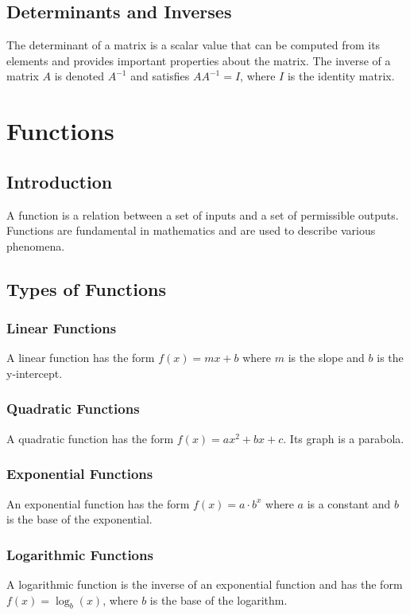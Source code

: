 \documentclass[a4paper,twoside,11pt]{book}
\newcommand{\chaptercolor}{}
\newcommand{\chaptercolors}[1]{%
  \ifcase#1%
    \renewcommand{\chaptercolor}{cyan!20!white}\or %
    \renewcommand{\chaptercolor}{red!20!white}\or  %
    \renewcommand{\chaptercolor}{yellow!20!white}\or %
    \renewcommand{\chaptercolor}{brown!20!white}  %
  \else
    \renewcommand{\chaptercolor}{white}
  \fi
}
\begin{document}
\section{Determinants and Inverses}
The determinant of a matrix is a scalar value that can be computed from its elements and provides important properties about the matrix. The inverse of a matrix \(A\) is denoted \(A^{-1}\) and satisfies \(AA^{-1} = I\), where \(I\) is the identity matrix.

\chapter{Functions}
\chaptercolors{3}
\section{Introduction}
A function is a relation between a set of inputs and a set of permissible outputs. Functions are fundamental in mathematics and are used to describe various phenomena.

\section{Types of Functions}
\subsection{Linear Functions}
A linear function has the form \( f(x) = mx + b \) where \(m\) is the slope and \(b\) is the y-intercept.

\subsection{Quadratic Functions}
A quadratic function has the form \( f(x) = ax^2 + bx + c \). Its graph is a parabola.

\subsection{Exponential Functions}
An exponential function has the form \( f(x) = a \cdot b^x \) where \(a\) is a constant and \(b\) is the base of the exponential.

\subsection{Logarithmic Functions}
A logarithmic function is the inverse of an exponential function and has the form \( f(x) = \log_b(x) \), where \(b\) is the base of the logarithm.
\end{document}
